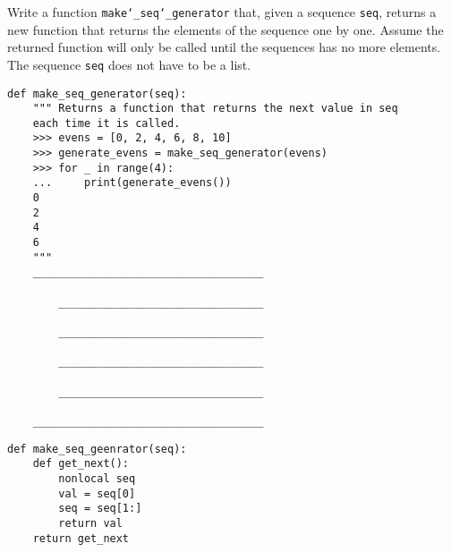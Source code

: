 \begin{blocksection}
\question Write a function \texttt{make\char`_seq\char`_generator} that, given a sequence \texttt{seq}, returns a new function that returns the elements of the sequence one by one. Assume the returned function will only be called until the sequences has no more elements. The sequence \texttt{seq} does not have to be a list.

\begin{lstlisting}
def make_seq_generator(seq):
    """ Returns a function that returns the next value in seq
    each time it is called.
    >>> evens = [0, 2, 4, 6, 8, 10]
    >>> generate_evens = make_seq_generator(evens)
    >>> for _ in range(4):
    ...     print(generate_evens())
    0
    2
    4
    6
    """
    ____________________________________
        
        ________________________________
        
        ________________________________
        
        ________________________________
        
        ________________________________

    ____________________________________
\end{lstlisting}

\begin{solution}
\begin{lstlisting}
def make_seq_geenrator(seq):
    def get_next():
        nonlocal seq
        val = seq[0]
        seq = seq[1:]
        return val
    return get_next
\end{lstlisting}
\end{solution}

\end{blocksection}


